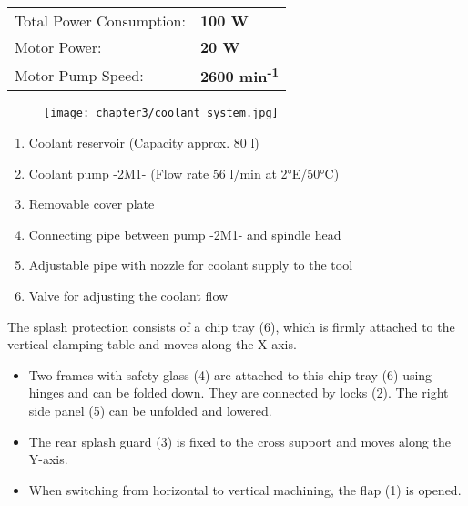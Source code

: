 \vspace{1cm}

\begin{tabular}{ll}
    Total Power Consumption: & \textbf{100 W} \\
    Motor Power: & \textbf{20 W} \\
    Motor Pump Speed: & \textbf{2600 min\textsuperscript{-1}}
\end{tabular}


\setcounter{section}{22}

\begin{figure}[h]
    \centering
    \texttt{[image: chapter3/coolant\_system.jpg]}
\end{figure}

\begin{enumerate}
    \item Coolant reservoir (Capacity approx. 80 l)\footnotemark
    \item Coolant pump -2M1- (Flow rate 56 l/min at 2°E/50°C)\footnotemark
    \item Removable cover plate
    \item Connecting pipe between pump -2M1- and spindle head
    \item Adjustable pipe with nozzle for coolant supply to the tool\footnotemark
    \item Valve for adjusting the coolant flow
\end{enumerate}



\setcounter{section}{24}

The splash protection consists of a chip tray (6), which is firmly attached to the vertical clamping table and moves along the X-axis.

\begin{itemize}
    \item Two frames with safety glass (4) are attached to this chip tray (6) using hinges and can be folded down. They are connected by locks (2). The right side panel (5) can be unfolded and lowered.
    \item The rear splash guard (3) is fixed to the cross support and moves along the Y-axis.
    \item When switching from horizontal to vertical machining, the flap (1) is opened.
\end{itemize}


